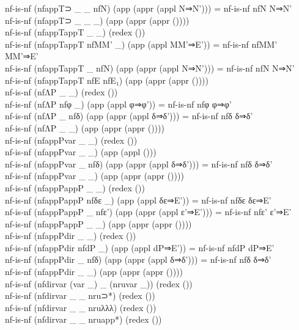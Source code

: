 {\begin{code}
{\>nf-is-nf (nfappT⊃ \_ \_ nfN) (app (appr (appl N⇒N'))) = nf-is-nf nfN N⇒N'\<\\
\>nf-is-nf (nfappT⊃ \_ \_ \_) (app (appr (appr ())))\<\\
\>nf-is-nf (nfappTappT \_ \_) (redex ())\<\\
\>nf-is-nf (nfappTappT nfMM' \_) (app (appl MM'⇒E')) = nf-is-nf nfMM' MM'⇒E'\<\\
\>nf-is-nf (nfappTappT \_ nfN) (app (appr (appl N⇒N'))) = nf-is-nf nfN N⇒N'\<\\
\>nf-is-nf (nfappTappT nfE nfE₁) (app (appr (appr ())))\<\\
\>nf-is-nf (nfΛP \_ \_) (redex ())\<\\
\>nf-is-nf (nfΛP nfφ \_) (app (appl φ⇒φ')) = nf-is-nf nfφ φ⇒φ'\<\\
\>nf-is-nf (nfΛP \_ nfδ) (app (appr (appl δ⇒δ'))) = nf-is-nf nfδ δ⇒δ'\<\\
\>nf-is-nf (nfΛP \_ \_) (app (appr (appr ())))\<\\
\>nf-is-nf (nfappPvar \_ \_) (redex ())\<\\
\>nf-is-nf (nfappPvar \_ \_) (app (appl ()))\<\\
\>nf-is-nf (nfappPvar \_ nfδ) (app (appr (appl δ⇒δ'))) = nf-is-nf nfδ δ⇒δ'\<\\
\>nf-is-nf (nfappPvar \_ \_) (app (appr (appr ())))\<\\
\>nf-is-nf (nfappPappP \_ \_) (redex ())\<\\
\>nf-is-nf (nfappPappP nfδε \_) (app (appl δε⇒E')) = nf-is-nf nfδε δε⇒E'\<\\
\>nf-is-nf (nfappPappP \_ nfε') (app (appr (appl ε'⇒E'))) = nf-is-nf nfε' ε'⇒E'\<\\
\>nf-is-nf (nfappPappP \_ \_) (app (appr (appr ())))\<\\
\>nf-is-nf (nfappPdir \_ \_) (redex ())\<\\
\>nf-is-nf (nfappPdir nfdP \_) (app (appl dP⇒E')) = nf-is-nf nfdP dP⇒E'\<\\
\>nf-is-nf (nfappPdir \_ nfδ) (app (appr (appl δ⇒δ'))) = nf-is-nf nfδ δ⇒δ'\<\\
\>nf-is-nf (nfappPdir \_ \_) (app (appr (appr ())))\<\\
\>nf-is-nf (nfdirvar (var \_) \_ (nruvar \_)) (redex ())\<\\
\>nf-is-nf (nfdirvar \_ \_ nru⊃*) (redex ())\<\\
\>nf-is-nf (nfdirvar \_ \_ nruλλλ) (redex ())\<\\
\>nf-is-nf (nfdirvar \_ \_ nruapp*) (redex ())\<\\
}
\end{code}}
